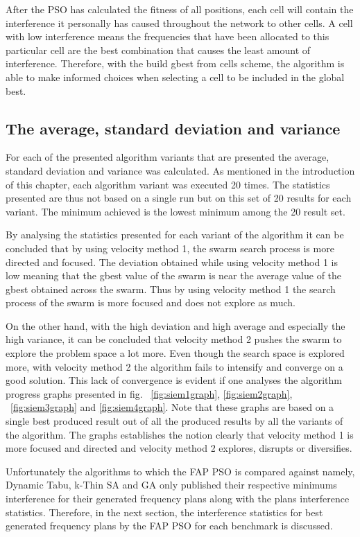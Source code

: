 After the PSO has calculated the fitness of all positions, each cell will contain the interference it personally has caused throughout the network to other cells. A cell with low interference means the frequencies that have been allocated to this particular cell are the best combination that causes the least amount of interference. Therefore, with the build gbest from cells scheme, the algorithm is able to make informed choices when selecting a cell to be included in the global best. 
\subsection{The average, standard deviation and variance}
For each of the presented algorithm variants that are presented the average, standard deviation and variance was calculated. As mentioned in the introduction of this chapter, each algorithm variant was executed 20 times. The statistics presented are thus not based on a single run but on this set of 20 results for each variant. The minimum achieved is the lowest minimum among the 20 result set.

By analysing the statistics presented for each variant of the algorithm it can be concluded that by using velocity method 1, the swarm search process is more directed and focused. The deviation obtained while using velocity method 1 is low meaning that the gbest value of the swarm is near the average value of the gbest obtained across the swarm. Thus by using velocity method 1 the search process of the swarm is more focused and does not explore as much.

On the other hand, with the high deviation and high average and especially the high variance, it can be concluded that velocity method 2 pushes the swarm to explore the problem space a lot more. Even though the search space is explored more, with velocity method 2 the algorithm fails to intensify and converge on a good solution. This lack of convergence is evident if one analyses the algorithm progress graphs presented in fig. ~\ref{fig:siem1graph}, \ref{fig:siem2graph}, ~\ref{fig:siem3graph} and \ref{fig:siem4graph}. Note that these graphs are based on a single best produced result out of all the produced results by all the variants of the algorithm. The graphs establishes the notion clearly that velocity method 1 is more focused and directed and velocity method 2 explores, disrupts or diversifies.

Unfortunately the algorithms to which the FAP PSO is compared against namely, Dynamic Tabu, k-Thin SA and GA only published their respective minimums interference for their generated frequency plans along with the plans interference statistics. Therefore, in the next section, the interference statistics for best generated frequency plans by the FAP PSO for each benchmark is discussed.

